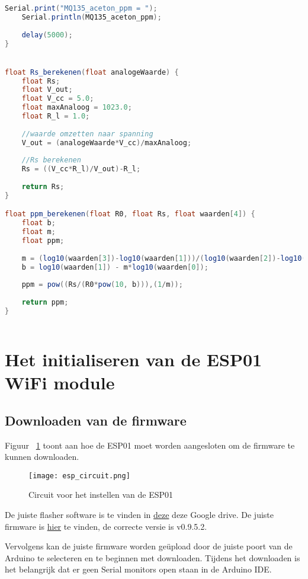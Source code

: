 \begin{lstlisting}[language=Java, caption={Berekenen van de ppm waarden voor de MQ-135}]
    Serial.print("MQ135_aceton_ppm = ");
    Serial.println(MQ135_aceton_ppm);
    
    delay(5000);
}


float Rs_berekenen(float analogeWaarde) {
    float Rs;
    float V_out;
    float V_cc = 5.0;
    float maxAnaloog = 1023.0;
    float R_l = 1.0;
    
    //waarde omzetten naar spanning
    V_out = (analogeWaarde*V_cc)/maxAnaloog;
    
    //Rs berekenen
    Rs = ((V_cc*R_l)/V_out)-R_l;
    
    return Rs;
}

float ppm_berekenen(float R0, float Rs, float waarden[4]) {
    float b;
    float m;
    float ppm;
    
    m = (log10(waarden[3])-log10(waarden[1]))/(log10(waarden[2])-log10(waarden[0]));
    b = log10(waarden[1]) - m*log10(waarden[0]);
    
    ppm = pow((Rs/(R0*pow(10, b))),(1/m));
    
    return ppm;
}
    
\end{lstlisting}



\section{Het initialiseren van de ESP01 WiFi module}
\label{sec:esp_init}

\subsection{Downloaden van de firmware}
\label{subsec:firmware}

Figuur 
~\ref{fig:esp_circuit} toont aan hoe de ESP01 moet worden aangesloten om de firmware te kunnen downloaden.

\begin{figure}[h]
    \texttt{[image: esp\_circuit.png]}
    \caption[Circuit ESP01]{Circuit voor het instellen van de ESP01}
    \label{fig:esp_circuit}
\end{figure}

De juiste flasher software is te vinden in \href{https://drive.google.com/open?id=1tD7IpE4rPMOWyQHP6xzjdRKjJAyeEZPj}{deze} deze Google drive. De juiste firmware is \href{https://wiki.aprbrother.com/en/Firmware_For_ESP8266.html}{hier} te vinden, de correcte versie is v0.9.5.2.

Vervolgens kan de juiste firmware worden geüpload door de juiste poort van de Arduino te selecteren en te beginnen met downloaden. Tijdens het downloaden is het belangrijk dat er geen Serial monitors open staan in de Arduino IDE.



